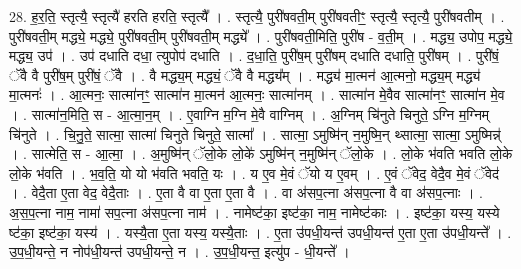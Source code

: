 \documentclass[17pt]{extarticle}
\begin{document}
28. ह॒र॒ति॒ स्तृत्यै॒ स्तृत्यै॑ हरति हरति॒ स्तृत्यै᳚ । . स्तृत्यै॒ पुरी॑षवती॒म् पुरी॑षवतीꣳ॒॒ स्तृत्यै॒ स्तृत्यै॒ पुरी॑षवतीम् । . पुरी॑षवती॒म् मद्ध्ये॒ मद्ध्ये॒ पुरी॑षवती॒म् पुरी॑षवती॒म् मद्ध्ये᳚ । . पुरी॑षवती॒मिति॒ पुरी॑ष - व॒ती॒म् । . मद्ध्य॒ उपोप॒ मद्ध्ये॒ मद्ध्य॒ उप॑ । . उप॑ दधाति दधा॒ त्युपोप॑ दधाति । . द॒धा॒ति॒ पुरी॑ष॒म् पुरी॑षम् दधाति दधाति॒ पुरी॑षम् । . पुरी॑षं॒ ॅवै वै पुरी॑ष॒म् पुरी॑षं॒ ॅवै । . वै मद्ध्य॒म् मद्ध्यं॒ ॅवै वै मद्ध्य᳚म् । . मद्ध्य॑ मा॒त्मन॑ आ॒त्मनो॒ मद्ध्य॒म् मद्ध्य॑ मा॒त्मनः॑ । . आ॒त्मनः॒ सात्मा॑नꣳ॒॒ सात्मा॑न मा॒त्मन॑ आ॒त्मनः॒ सात्मा॑नम् । . सात्मा॑न मे॒वैव सात्मा॑नꣳ॒॒ सात्मा॑न मे॒व । . सात्मा॑न॒मिति॒ स - आ॒त्मा॒न॒म् । . ए॒वाग्नि म॒ग्नि मे॒वै वाग्निम् । . अ॒ग्निम् चि॑नुते चिनुते॒ ऽग्नि म॒ग्निम् चि॑नुते । . चि॒नु॒ते॒ सात्मा॒ सात्मा॑ चिनुते चिनुते॒ सात्मा᳚ । . सात्मा॒ ऽमुष्मि॑न् न॒मुष्मि॒न् थ्सात्मा॒ सात्मा॒ ऽमुष्मिन्न्॑ । . सात्मेति॒ स - आ॒त्मा॒ । . अ॒मुष्मि॑न् ॅलो॒के लो॒के॑ ऽमुष्मि॑न् न॒मुष्मि॑न् ॅलो॒के । . लो॒के भ॑वति भवति लो॒के लो॒के भ॑वति । . भ॒व॒ति॒ यो यो भ॑वति भवति॒ यः । . य ए॒व मे॒वं ॅयो य ए॒वम् । . ए॒वं ॅवेद॒ वेदै॒व मे॒वं ॅवेद॑ । . वेदै॒ता ए॒ता वेद॒ वेदै॒ताः । . ए॒ता वै वा ए॒ता ए॒ता वै । . वा अ॑सप॒त्ना अ॑सप॒त्ना वै वा अ॑सप॒त्नाः । . अ॒स॒प॒त्ना नाम॒ नामा॑ सप॒त्ना अ॑सप॒त्ना नाम॑ । . नामेष्ट॑का॒ इष्ट॑का॒ नाम॒ नामेष्ट॑काः । . इष्ट॑का॒ यस्य॒ यस्ये ष्ट॑का॒ इष्ट॑का॒ यस्य॑ । . यस्यै॒ता ए॒ता यस्य॒ यस्यै॒ताः । . ए॒ता उ॑पधी॒यन्त॑ उपधी॒यन्त॑ ए॒ता ए॒ता उ॑पधी॒यन्ते᳚ । . उ॒प॒धी॒यन्ते॒ न नोप॑धी॒यन्त॑ उपधी॒यन्ते॒ न । . उ॒प॒धी॒यन्त॒ इत्यु॑प - धी॒यन्ते᳚ । \newline
\end{document}
